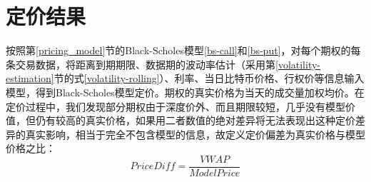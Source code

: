 \section{定价结果}
按照第\ref{pricing_model}节的Black-Scholes模型\ref{bs-call}和\ref{bs-put}，对每个期权的每条交易数据，将距离到期期限、数据期的波动率估计（采用第\ref{volatility-estimation}节的式\ref{volatility-rolling}）、利率、当日比特币价格、行权价等信息输入模型，得到Black-Scholes模型定价。期权的真实价格为当天的成交量加权均价。在定价过程中，我们发现部分期权由于深度价外、而且期限较短，几乎没有模型价值，但仍有较高的真实价格，如果用二者数值的绝对差异将无法表现出这种定价差异的真实影响，相当于完全不包含模型的信息，故定义定价偏差为真实价格与模型价格之比：
\begin{equation}
Price Diff=\frac{VWAP}{Model Price}
\label{eq:diff}
\end{equation}

